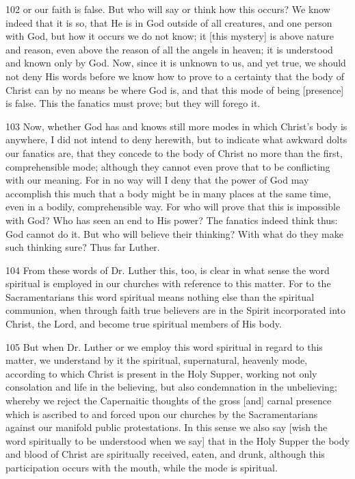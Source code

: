 102 or our faith is false. But who will say or think how this occurs? We know indeed that it is so, that He is in God outside of all creatures, and one person with God, but how it occurs we do not know; it [this mystery] is above nature and reason, even above the reason of all the angels in heaven; it is understood and known only by God. Now, since it is unknown to us, and yet true, we should not deny His words before we know how to prove to a certainty that the body of Christ can by no means be where God is, and that this mode of being [presence] is false. This the fanatics must prove; but they will forego it.

103 Now, whether God has and knows still more modes in which Christ’s body is anywhere, I did not intend to deny herewith, but to indicate what awkward dolts our fanatics are, that they concede to the body of Christ no more than the first, comprehensible mode; although they cannot even prove that to be conflicting with our meaning. For in no way will I deny that the power of God may accomplish this much that a body might be in many places at the same time, even in a bodily, comprehensible way. For who will prove that this is impossible with God? Who has seen an end to His power? The fanatics indeed think thus: God cannot do it. But who will believe their thinking? With what do they make such thinking sure? Thus far Luther.

104 From these words of Dr. Luther this, too, is clear in what sense the word spiritual is employed in our churches with reference to this matter. For to the Sacramentarians this word spiritual means nothing else than the spiritual communion, when through faith true believers are in the Spirit incorporated into Christ, the Lord, and become true spiritual members of His body.

105 But when Dr. Luther or we employ this word spiritual in regard to this matter, we understand by it the spiritual, supernatural, heavenly mode, according to which Christ is present in the Holy Supper, working not only consolation and life in the believing, but also condemnation in the unbelieving; whereby we reject the Capernaitic thoughts of the gross [and] carnal presence which is ascribed to and forced upon our churches by the Sacramentarians against our manifold public protestations. In this sense we also say [wish the word spiritually to be understood when we say] that in the Holy Supper the body and blood of Christ are spiritually received, eaten, and drunk, although this participation occurs with the mouth, while the mode is spiritual.

